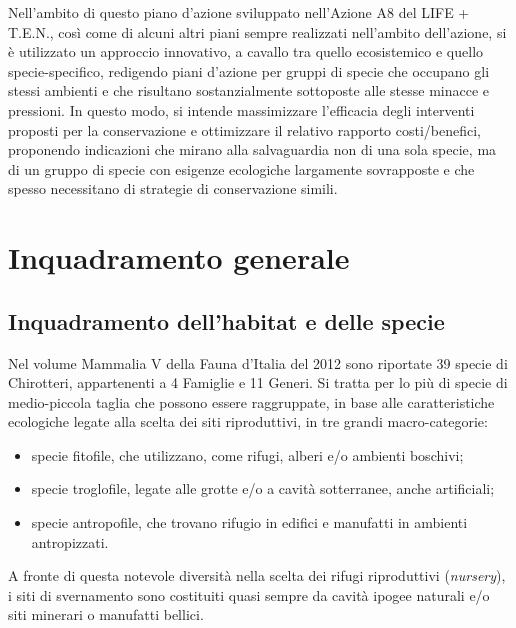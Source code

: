 \documentclass[10pt,twoside,openany,x11names,svgnames,italian,a5paper,dvipsnames,table]{memoir}
\newcommand\chapterillustration{}
\begin{document}
Nell'ambito di questo piano d'azione sviluppato nell'Azione A8 del LIFE + T.E.N., così come di alcuni altri piani sempre realizzati nell'ambito dell'azione, si è utilizzato un approccio innovativo, a cavallo tra quello ecosistemico e quello specie-specifico, redigendo piani d'azione per gruppi di specie che occupano gli stessi ambienti e che risultano sostanzialmente sottoposte alle stesse minacce e pressioni. In questo modo, si intende massimizzare l'efficacia degli interventi proposti per la conservazione e ottimizzare il relativo rapporto costi/benefici, proponendo indicazioni che mirano alla salvaguardia non di una sola specie, ma di un gruppo di specie con esigenze ecologiche largamente sovrapposte e che spesso necessitano di strategie di conservazione simili.\\



\normalsize
\setlength\afterchapskip{55mm}
\chapter{Inquadramento generale}
\renewcommand\chapterillustration{1.jpg}

\section{Inquadramento dell'habitat e delle specie}
Nel volume Mammalia V della Fauna d’Italia \cite{Lanza} del 2012 sono riportate 39 specie di Chirotteri, appartenenti a 4 Famiglie e 11 Generi. Si tratta per lo più di specie di medio-piccola taglia che possono essere raggruppate, in base alle caratteristiche ecologiche legate alla scelta dei siti riproduttivi, in tre grandi macro-categorie:

\begin{itemize}\itemsep0pt
  \item specie fitofile, che utilizzano, come rifugi, alberi e/o ambienti boschivi;
  \item specie troglofile, legate alle grotte e/o a cavità sotterranee, anche artificiali;
  \item specie antropofile, che trovano rifugio in edifici e manufatti in ambienti antropizzati.
\end{itemize}

A fronte di questa notevole diversità nella scelta dei rifugi riproduttivi (\emph{nursery}), i siti di svernamento sono costituiti quasi sempre da cavità ipogee naturali e/o siti minerari o manufatti bellici.
\end{document}
